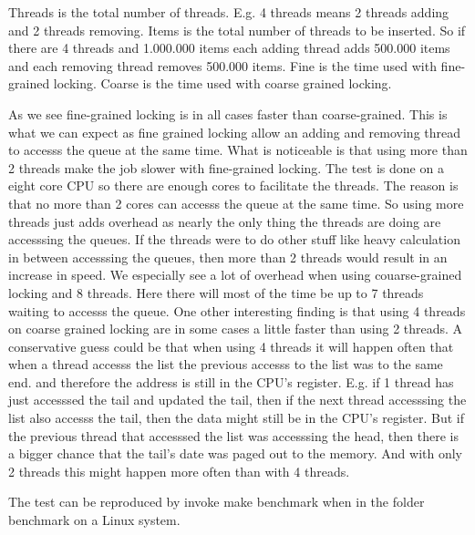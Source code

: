 \documentclass[a4paper,12pt,danish]{report}
\begin{document}
Threads is the total number of threads. E.g. 4 threads means 2 threads
adding and 2 threads removing.
Items is the total number of threads to be inserted. So if there are 4 threads
and 1.000.000 items each adding thread adds 500.000 items and each removing
thread removes 500.000 items.
Fine is the time used with fine-grained locking.
Coarse is the time used with coarse grained locking.

As we see fine-grained locking is in all cases faster than coarse-grained. This
is what we can expect as fine grained locking allow an adding and
removing thread to accesss the queue at the same time. What is noticeable is that
using more than 2 threads make the job slower with fine-grained locking. The
test is done on a eight core CPU so there are enough cores to facilitate the
threads. The reason is that no more than 2 cores can accesss the queue at the
same time. So using more threads just adds overhead as nearly the only thing the
threads are doing are accesssing the queues. If the threads were to do other stuff like
heavy calculation in between accesssing the queues, then more than 2 threads
would result in an increase in speed. We especially see a lot of overhead when
using couarse-grained locking and 8 threads. Here there will most of the time be
up to 7 threads waiting to accesss the queue. One other interesting finding is
that using 4 threads on coarse grained locking are in some cases a little faster
than using 2 threads. A conservative guess could be that when using 4
threads it will happen often that when a thread accesss the list the previous
accesss to the list was to the same end. and therefore the address is still in
the CPU's register. E.g. if 1 thread has just accesssed the tail and updated the
tail, then if the next thread accesssing the list also accesss the tail, then the
data might still be in the CPU's register. But if the previous thread that
accesssed the list was accesssing the head, then there is a bigger chance that the
tail's date was paged out to the memory. And with only 2 threads this might
happen more often than with 4 threads.

The test can be reproduced by invoke make benchmark when in the folder benchmark
on a Linux system.

\newpage
\end{document}
